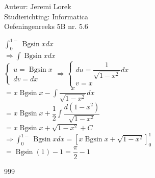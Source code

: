 \documentclass[a4paper]{article}
\begin{document}
\noindent \large Auteur: Jeremi Lorek\\
\noindent \large Studierichting: Informatica\\
\noindent \large Oefeningenreeks 5B nr. 5.6\\

\medskip
\normalsize

$\displaystyle \int_0^{1-} \operatorname{Bgsin} x  dx$ \\

$\Rightarrow \displaystyle \int \operatorname{Bgsin} x  dx$ \\

$\left\{
   \begin{array}{l}
       u = \operatorname{Bgsin} x \\
       dv = dx
   \end{array}
\right.
\Rightarrow
\left\{
   \begin{array}{l}
       du = \dfrac{1}{\sqrt{1 - x^2}} dx \\
       v = x
   \end{array}
\right.$ \\

$= x \operatorname{Bgsin} x - \displaystyle \int \dfrac{x}{\sqrt{1 - x^2}} dx$ \\

$= x \operatorname{Bgsin} x + \dfrac{1}{2} \displaystyle \int \dfrac{d(1 - x^2)}{\sqrt{1 - x^2}}$ \\

$= x \operatorname{Bgsin} x + \sqrt{1 - x^2} + C$ \\

$\Rightarrow \displaystyle \int_0^{1-} \operatorname{Bgsin} x  dx = \left[ x \operatorname{Bgsin} x + \sqrt{1 - x^2} \right]_0^1$ \\

$= \operatorname{Bgsin}(1) - 1 = \dfrac{\pi}{2} - 1$ \\

\begin{thebibliography}{999}
\end{thebibliography}
\end{document}
